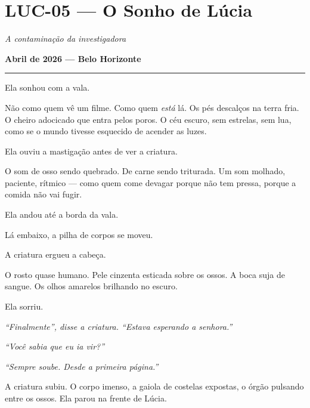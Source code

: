 \section*{\textbf{LUC-05} --- O Sonho de Lúcia}

\noindent \textit{A contaminação da investigadora}

\noindent \textbf{Abril de 2026 --- Belo Horizonte}

\vspace{0.5em}\noindent\rule{\textwidth}{0.5pt}\vspace{0.5em}

\noindent Ela sonhou com a vala.

\noindent Não como quem vê um filme. Como quem \textit{está} lá. Os pés descalços na terra fria. O cheiro adocicado que entra pelos poros. O céu escuro, sem estrelas, sem lua, como se o mundo tivesse esquecido de acender as luzes.

\noindent Ela ouviu a mastigação antes de ver a criatura.

\noindent O som de osso sendo quebrado. De carne sendo triturada. Um som molhado, paciente, rítmico --- como quem come devagar porque não tem pressa, porque a comida não vai fugir.

\noindent Ela andou até a borda da vala.

\noindent Lá embaixo, a pilha de corpos se moveu.

\noindent A criatura ergueu a cabeça.

\noindent O rosto quase humano. Pele cinzenta esticada sobre os ossos. A boca suja de sangue. Os olhos amarelos brilhando no escuro.

\noindent Ela sorriu.

\noindent \textit{\textquotedblleft{}Finalmente\textquotedblright{}\textit{, disse a criatura. }\textquotedblleft{}Estava esperando a senhora.\textquotedblright{}}

\noindent \textit{\textquotedblleft{}Você sabia que eu ia vir?\textquotedblright{}}

\noindent \textit{\textquotedblleft{}Sempre soube. Desde a primeira página.\textquotedblright{}}

\noindent A criatura subiu. O corpo imenso, a gaiola de costelas expostas, o órgão pulsando entre os ossos. Ela parou na frente de Lúcia.

